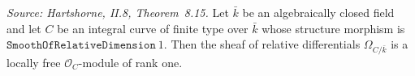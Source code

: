 \begin{lemma}
  \label{lem:smooth_kaehler_locallyFree_rank_one}
  \textit{Source: Hartshorne, II.8, Theorem~8.15.}
  Let \(\bar k\) be an algebraically closed field and let \(C\) be an
  integral curve of finite type over \(\bar k\) whose structure morphism
  is \(\texttt{SmoothOfRelativeDimension}\ 1\). Then the sheaf of relative
  differentials \(\Omega_{C/\bar k}\) is a locally free
  \(\mathcal O_C\)-module of rank one.
\end{lemma}

